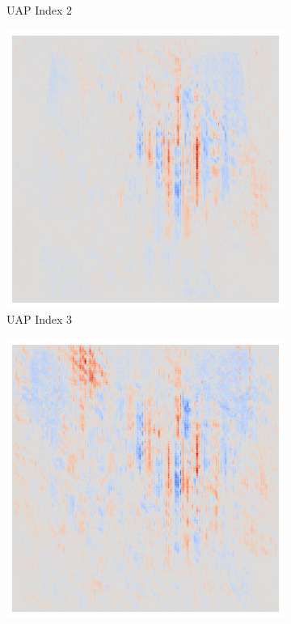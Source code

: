 \begin{figure}[ht!]
\begin{subfigure}{0.19\linewidth}
        \caption{UAP Index 2}
    \end{subfigure}\hfill%
    \begin{subfigure}{0.19\linewidth}
        \centering
        \includegraphics[height=1\linewidth]{01-images/05-resultate/uap_efficientnet/uap0-efficientnetv2m-mri-n200-robustificationslevel3.png}
        \caption{UAP Index 3}
    \end{subfigure}\hfill%
    \begin{subfigure}{0.19\linewidth}
        \centering
        \includegraphics[height=1\linewidth]{01-images/05-resultate/uap_efficientnet/uap0-efficientnetv2m-mri-n200-robustificationslevel4.png}

\end{subfigure}
\end{figure}

